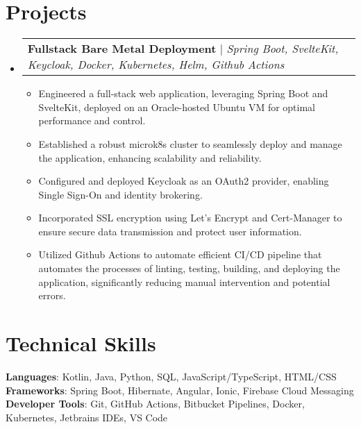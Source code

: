 \documentclass[letterpaper,11pt]{article}
\makeatletter
\newcommand{\resumeItem}[1]{
  \item\small{
    {#1 \vspace{-2pt}}
  }
}
\newcommand{\resumeProjectHeading}[2]{
    \item
    \begin{tabular*}{0.97\textwidth}{l@{\extracolsep{\fill}}r}
      \small#1 & #2 \\
    \end{tabular*}\vspace{-7pt}
}
\newcommand{\resumeSubHeadingListStart}{\begin{itemize}[leftmargin=0.15in, label={}]}
\newcommand{\resumeSubHeadingListEnd}{\end{itemize}}
\newcommand{\resumeItemListStart}{\begin{itemize}}
\newcommand{\resumeItemListEnd}{\end{itemize}\vspace{-5pt}}
\makeatother
\begin{document}
\section{Projects}
    \resumeSubHeadingListStart
      \resumeProjectHeading
      {\textbf{Fullstack Bare Metal Deployment} $|$ \emph{Spring Boot, SvelteKit, Keycloak, Docker, Kubernetes, Helm, Github Actions}}{}
      \resumeItemListStart
          \resumeItem{Engineered a full-stack web application, leveraging Spring Boot and SvelteKit, deployed on an Oracle-hosted Ubuntu VM for optimal performance and control.}
          \resumeItem{Established a robust microk8s cluster to seamlessly deploy and manage the application, enhancing scalability and reliability.}
          \resumeItem{Configured and deployed Keycloak as an OAuth2 provider, enabling Single Sign-On and identity brokering.}
          \resumeItem{Incorporated SSL encryption using Let's Encrypt and Cert-Manager to ensure secure data transmission and protect user information.}
          \resumeItem{Utilized Github Actions to automate efficient CI/CD pipeline that automates the processes of linting, testing, building, and deploying the application, significantly reducing manual intervention and potential errors.}
      \resumeItemListEnd
      \iffalse
          \resumeProjectHeading
          {\textbf{Simple Paintball} $|$ \emph{Spigot API, Java, Maven, TravisCI, Git}}{May 2018 -- May 2020}
          \resumeItemListStart
            \resumeItem{Developed a Minecraft server plugin to entertain kids during free time for a previous job}
            \resumeItem{Published plugin to websites gaining 2K+ downloads and an average 4.5/5-star review}
            \resumeItem{Implemented continuous delivery using TravisCI to build the plugin upon new a release}
            \resumeItem{Collaborated with Minecraft server administrators to suggest features and get feedback about the plugin}
          \resumeItemListEnd
      \fi
    \resumeSubHeadingListEnd



%
\section{Technical Skills}
 \begin{itemize}[leftmargin=0.15in, label={}]
    \small{\item{
     \textbf{Languages}{: Kotlin, Java, Python, SQL, JavaScript/TypeScript, HTML/CSS} \\
     \textbf{Frameworks}{: Spring Boot, Hibernate, Angular, Ionic, Firebase Cloud Messaging} \\
     \textbf{Developer Tools}{: Git, GitHub Actions, Bitbucket Pipelines, Docker, Kubernetes, Jetbrains IDEs, VS Code} \\
     \iffalse
     \textbf{Libraries}{: RxJS } \\
     \fi
    }}
 \end{itemize}


\end{document}
